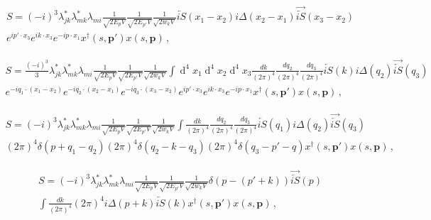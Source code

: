 \begin{align}
S={(-i)^{3}}\lambda^*_{jk}\lambda^*_{mk}\lambda_{mi}\frac{1}{\sqrt{2E_p V}}\frac{1}{\sqrt{2E_{p'} V}}\frac{1}{\sqrt{2w_k V}}\overleftarrow{iS}(x_{1}-x_{2})i\Delta(x_{2}-x_{1})\overrightarrow{\overleftarrow{iS}}(x_{3}-x_{2})\nonumber \\ e^{i p'\cdot x_{3}}e^{i k\cdot x_{3}}e^{-i p\cdot x_{1}}x^{\dagger}(s,\boldsymbol{p'})x(s,\boldsymbol{p})\, ,
\end{align}

\begin{align}
S=\frac{(-i)^{3}}{3}\lambda^*_{jk}\lambda^*_{mk}\lambda_{mi}\frac{1}{\sqrt{2E_p V}}\frac{1}{\sqrt{2E_{p'} V}}\frac{1}{\sqrt{2w_k V}}\int\operatorname{d}^{4}x_{1}\operatorname{d}^{4}x_{2}
\operatorname{d}^{4}x_{3} \frac{dk}{(2\pi)^4}\frac{dq_{2}}{(2\pi)^4}\frac{dq_{3}}{(2\pi)^4}\overleftarrow{iS}(k)i\Delta(q_{2})\overrightarrow{\overleftarrow{iS}}(q_{3})\nonumber\\ 
e^{-iq_{1}\cdot (x_{1}-x_{2})}e^{-iq_{2}\cdot (x_{2}-x_{1})}e^{-iq_{3}\cdot (x_{3}-x_{2})}e^{i p'\cdot x_{3}}e^{i k\cdot x_{3}}e^{-i p\cdot x_{1}}x^{\dagger}(s,\boldsymbol{p'})x(s,\boldsymbol{p})\, ,
\end{align}

\begin{align}
S={(-i)^{3}}\lambda^*_{jk}\lambda^*_{mk}\lambda_{mi}\frac{1}{\sqrt{2E_p V}}\frac{1}{\sqrt{2E_{p'} V}}\frac{1}{\sqrt{2w_k V}}\int \frac{dk}{(2\pi)^4}\frac{dq_{2}}{(2\pi)^4}\frac{dq_{3}}{(2\pi)^4}\overleftarrow{iS}(q_{1})i\Delta(q_{2})\overrightarrow{\overleftarrow{iS}}(q_{3})\nonumber\\(2\pi)^4\delta(p+q_{1}-q_{2})(2\pi)^4\delta(q_{2}-k-q_{3})(2\pi)^4\delta(q_{3}-p'-q)x^\dagger(s,\boldsymbol{p'})x(s,\boldsymbol{p})\, ,
\end{align}

\begin{align}
S={(-i)^{3}}\lambda^*_{jk}\lambda^*_{mk}\lambda_{mi}\frac{1}{\sqrt{2E_p V}}\frac{1}{\sqrt{2E_{p'} V}}\frac{1}{\sqrt{2w_k V}}\delta(p-(p'+k))\overrightarrow{\overleftarrow{iS}}(p)\nonumber \\ \int \frac{dk}{(2\pi)^4}(2\pi)^4i\Delta(p+k){\overleftarrow{iS}}(k)x^\dagger(s,\boldsymbol{p'})x(s,\boldsymbol{p})\, ,
\end{align}

